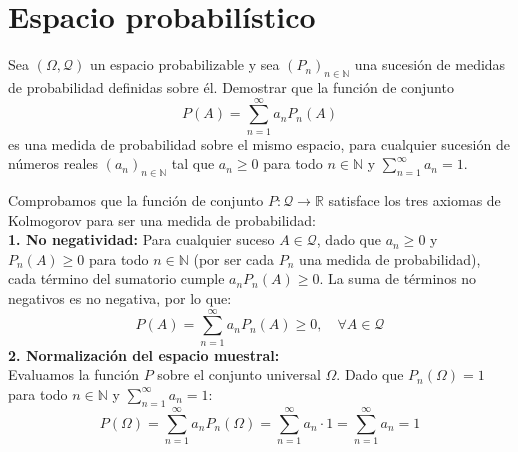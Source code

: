 \section{Espacio probabilístico}
\setcounter{problemacontador}{0}
\begin{problema}
Sea $(\Omega, \mathcal{Q})$ un espacio probabilizable y sea $(P_n)_{n \in \mathbb{N}}$ una sucesión de medidas de probabilidad definidas sobre él. Demostrar que la función de conjunto
\[
    P(A) = \sum_{n=1}^\infty a_n P_n(A)
\]
es una medida de probabilidad sobre el mismo espacio, para cualquier sucesión de números reales $(a_n)_{n \in \mathbb{N}}$ tal que $a_n \ge 0$ para todo $n \in \mathbb{N}$ y $\displaystyle \sum_{n=1}^\infty a_n = 1$.

\tcblower

Comprobamos que la función de conjunto $P : \mathcal{Q} \to \mathbb{R}$ satisface los tres axiomas de Kolmogorov para ser una medida de probabilidad:\\[4pt]
\noindent
\textbf{1. No negatividad:}
Para cualquier suceso $A \in \mathcal{Q}$, dado que $a_n \ge 0$ y $P_n(A) \ge 0$ para todo $n \in \mathbb{N}$ (por ser cada $P_n$ una medida de probabilidad), cada término del sumatorio cumple $a_n P_n(A) \ge 0$.
La suma de términos no negativos es no negativa, por lo que:
\[
    P(A) = \sum_{n=1}^\infty a_n P_n(A) \ge 0, \quad \forall A \in \mathcal{Q}
\]
\noindent
\textbf{2. Normalización del espacio muestral:}\\
Evaluamos la función $P$ sobre el conjunto universal $\Omega$. Dado que $P_n(\Omega) = 1$ para todo $n \in \mathbb{N}$ y $\displaystyle \sum_{n=1}^\infty a_n = 1$:
\[
    P(\Omega) = \sum_{n=1}^\infty a_n P_n(\Omega) = \sum_{n=1}^\infty a_n \cdot 1 = \sum_{n=1}^\infty a_n = 1
\]


\end{problema}
